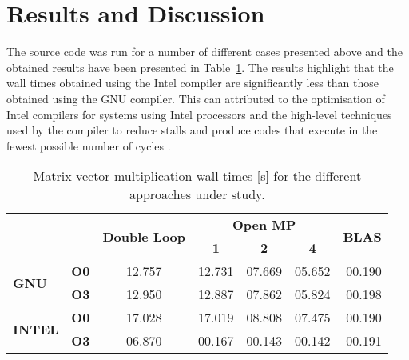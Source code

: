 \documentclass[11pt, oneside]{article}   	%
\begin{document}
\section{Results and Discussion}
The source code was run for a number of different cases presented above and the obtained results have been presented in Table~\ref{tab:times}. The results highlight that the wall times obtained using the Intel compiler are significantly less than those obtained using the  GNU compiler. This can attributed to the optimisation of Intel compilers for systems using Intel processors and the high-level techniques used by the compiler to reduce stalls and produce codes that execute in the fewest possible number of cycles \cite{Corporation:2018aa}.
\begin{table}[htp]
\caption{Matrix vector multiplication wall times [s] for the different approaches under study.}
\label{tab:times}
\centering
\begin{tabular}{@{}lcccccr@{}}
\toprule
                                & \multicolumn{1}{l}{} & \multirow{2}{*}{\textbf{Double Loop}} & \multicolumn{3}{c}{\textbf{Open MP}} & \multicolumn{1}{c}{\multirow{2}{*}{\textbf{BLAS}}} \\ \cmidrule(lr){4-6}
                                & \multicolumn{1}{l}{} &                                       & \textbf{1} & \textbf{2} & \textbf{4} & \multicolumn{1}{c}{}                               \\ \midrule
\multirow{2}{*}{\textbf{GNU}}   & \textbf{O0}          & 12.757                                & 12.731     & 07.669     & 05.652     & 00.190                                             \\
                                & \textbf{O3}          & 12.950                                & 12.887     & 07.862     & 05.824     & 00.198                                             \\
\multirow{2}{*}{\textbf{INTEL}} & \textbf{O0}          & 17.028                                & 17.019     & 08.808     & 07.475     & 00.190                                             \\
                                & \textbf{O3}          & 06.870                                & 00.167     & 00.143     & 00.142     & 00.191                                             \\ \bottomrule
\end{tabular}
\end{table}
\end{document}
